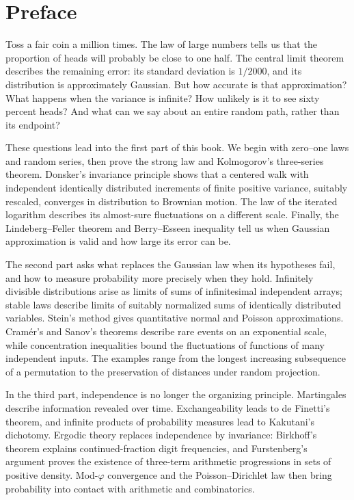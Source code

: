 \chapter*{Preface}

Toss a fair coin a million times. The law of large numbers tells us that the proportion of heads will probably be close to one half. The central limit theorem describes the remaining error: its standard deviation is $1/2000$, and its distribution is approximately Gaussian. But how accurate is that approximation? What happens when the variance is infinite? How unlikely is it to see sixty percent heads? And what can we say about an entire random path, rather than its endpoint?

These questions lead into the first part of this book. We begin with zero--one laws and random series, then prove the strong law and Kolmogorov's three-series theorem. Donsker's invariance principle shows that a centered walk with independent identically distributed increments of finite positive variance, suitably rescaled, converges in distribution to Brownian motion. The law of the iterated logarithm describes its almost-sure fluctuations on a different scale. Finally, the Lindeberg--Feller theorem and Berry--Esseen inequality tell us when Gaussian approximation is valid and how large its error can be.

The second part asks what replaces the Gaussian law when its hypotheses fail, and how to measure probability more precisely when they hold. Infinitely divisible distributions arise as limits of sums of infinitesimal independent arrays; stable laws describe limits of suitably normalized sums of identically distributed variables. Stein's method gives quantitative normal and Poisson approximations. Cram\'er's and Sanov's theorems describe rare events on an exponential scale, while concentration inequalities bound the fluctuations of functions of many independent inputs. The examples range from the longest increasing subsequence of a permutation to the preservation of distances under random projection.

In the third part, independence is no longer the organizing principle. Martingales describe information revealed over time. Exchangeability leads to de Finetti's theorem, and infinite products of probability measures lead to Kakutani's dichotomy. Ergodic theory replaces independence by invariance: Birkhoff's theorem explains continued-fraction digit frequencies, and Furstenberg's argument proves the existence of three-term arithmetic progressions in sets of positive density. Mod-$\varphi$ convergence and the Poisson--Dirichlet law then bring probability into contact with arithmetic and combinatorics.

